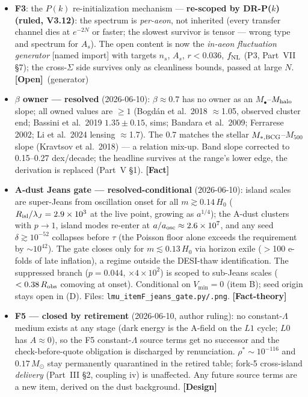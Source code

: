 \documentclass[11pt]{article}
\newcommand{\fact}{\textcolor{green!40!black}{\textbf{[Fact]}}}
\newcommand{\factth}{\textcolor{green!40!black}{\textbf{[Fact-theory]}}}
\newcommand{\design}{\textcolor{blue!60!black}{\textbf{[Design]}}}
\newcommand{\open}{\textcolor{red!70!black}{\textbf{[Open]}}}
\begin{document}
\begin{itemize}[leftmargin=2.6em,itemsep=3pt]
\item[\textbf{(D)}] \textbf{F3}: the $P(k)$ re-initialization mechanism --- \textbf{re-scoped by DR-P($k$) (ruled, V3.12)}: the spectrum is \emph{per-aeon}, not inherited (every transfer channel dies at $e^{-2N}$ or faster; the slowest survivor is tensor --- wrong type and spectrum for $A_s$). The open content is now the \emph{in-aeon fluctuation generator} [named import] with targets $n_s$, $A_s$, $r<0.036$, $f_{\rm NL}$ (P3, Part~VII \S7); the cross-$\Sigma$ side survives only as cleanliness bounds, passed at large $N$. \open\ (generator)
\item[\textbf{(E)}] \textbf{$\beta$ owner --- resolved} (2026-06-10): $\beta\approx0.7$ has no owner as an $M_\bullet$--$M_{\rm halo}$ slope; all owned values are $\ge1$ (Bogd\'an et al.\ 2018 $\approx$1.05, observed cluster end; Bassini et al.\ 2019 $1.35\pm0.15$, sims; Bandara et al.\ 2009; Ferrarese 2002; Li et al.\ 2024 lensing $\approx$1.7). The 0.7 matches the stellar $M_{*,\rm BCG}$--$M_{500}$ slope (Kravtsov et al.\ 2018) --- a relation mix-up. Band slope corrected to 0.15--0.27 dex/decade; the headline survives at the range's lower edge, the derivation is replaced (Part~V \S1). \fact
\item[\textbf{(F)}] \textbf{A-dust Jeans gate --- resolved-conditional} (2026-06-10): island scales are super-Jeans from oscillation onset for all $m\gtrsim0.14\,H_0$ ($R_{\rm isl}/\lambda_J=2.9\times10^3$ at the live point, growing as $a^{1/4}$); the A-dust clusters with $p\to1$, island modes re-enter at $a/a_{\rm osc}\approx2.6\times10^7$, and any seed $\delta\gtrsim10^{-52}$ collapses before $\tau$ (the Poisson floor alone exceeds the requirement by $\sim\!10^{42}$). The gate closes only for $m\lesssim0.13\,H_0$ via horizon exile ($>$100 e-folds of late inflation), a regime outside the DESI-thaw identification. The suppressed branch ($p=0.044$, $\times4\times10^2$) is scoped to sub-Jeans scales ($<0.38\,R_{\rm obs}$ comoving at onset). Conditional on $V_{\min}=0$ (item B); seed origin stays open in (D). Files: \texttt{lmu\_itemF\_jeans\_gate.py/.png}. \factth
\item[\textbf{(G)}] \textbf{F5 --- closed by retirement} (2026-06-10, author ruling): no constant-$\Lambda$ medium exists at any stage (dark energy is the A-field on the $L1$ cycle; $L0$ has $A\approx0$), so the F5 constant-$\Lambda$ source terms get no successor and the check-before-quote obligation is discharged by renunciation. $\rho^*\sim10^{-116}$ and $0.17\,M_\odot$ stay permanently quarantined in the retired table; fork-5 cross-island \emph{delivery} (Part~III \S2, coupling iv) is unaffected. Any future source terms are a new item, derived on the dust background. \design

\end{itemize}
\end{document}
